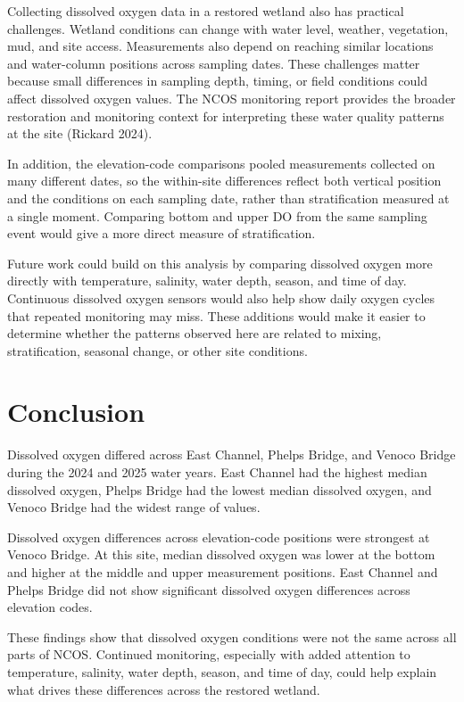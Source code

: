 \documentclass[
  letterpaper,
  DIV=11,
  numbers=noendperiod]{scrartcl}
\begin{document}
Collecting dissolved oxygen data in a restored wetland also has
practical challenges. Wetland conditions can change with water level,
weather, vegetation, mud, and site access. Measurements also depend on
reaching similar locations and water-column positions across sampling
dates. These challenges matter because small differences in sampling
depth, timing, or field conditions could affect dissolved oxygen values.
The NCOS monitoring report provides the broader restoration and
monitoring context for interpreting these water quality patterns at the
site (Rickard 2024).

In addition, the elevation-code comparisons pooled measurements
collected on many different dates, so the within-site differences
reflect both vertical position and the conditions on each sampling date,
rather than stratification measured at a single moment. Comparing bottom
and upper DO from the same sampling event would give a more direct
measure of stratification.

Future work could build on this analysis by comparing dissolved oxygen
more directly with temperature, salinity, water depth, season, and time
of day. Continuous dissolved oxygen sensors would also help show daily
oxygen cycles that repeated monitoring may miss. These additions would
make it easier to determine whether the patterns observed here are
related to mixing, stratification, seasonal change, or other site
conditions.

\section{Conclusion}\label{conclusion}

Dissolved oxygen differed across East Channel, Phelps Bridge, and Venoco
Bridge during the 2024 and 2025 water years. East Channel had the
highest median dissolved oxygen, Phelps Bridge had the lowest median
dissolved oxygen, and Venoco Bridge had the widest range of values.

Dissolved oxygen differences across elevation-code positions were
strongest at Venoco Bridge. At this site, median dissolved oxygen was
lower at the bottom and higher at the middle and upper measurement
positions. East Channel and Phelps Bridge did not show significant
dissolved oxygen differences across elevation codes.

These findings show that dissolved oxygen conditions were not the same
across all parts of NCOS. Continued monitoring, especially with added
attention to temperature, salinity, water depth, season, and time of
day, could help explain what drives these differences across the
restored wetland.
\end{document}

